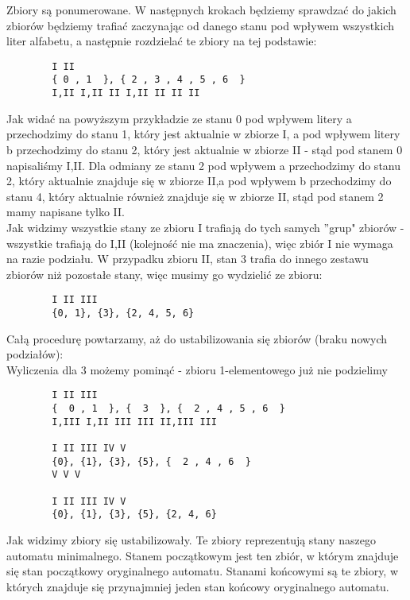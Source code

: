 \documentclass[main.tex]{subfiles}
\begin{document}
    \noindent Zbiory są ponumerowane. W następnych krokach będziemy sprawdzać do jakich zbiorów będziemy trafiać zaczynając od danego stanu pod wpływem wszystkich liter alfabetu,
    a następnie rozdzielać te zbiory na tej podstawie:
    \begin{verbatim}
        I II
        { 0 , 1  }, { 2 , 3 , 4 , 5 , 6  }
        I,II I,II II I,II II II II
    \end{verbatim}

    \noindent Jak widać na powyższym przykładzie ze stanu 0 pod wpływem litery a przechodzimy do stanu 1, który jest aktualnie w zbiorze I,
    a pod wpływem litery b przechodzimy do stanu 2, który jest aktualnie w zbiorze II - stąd pod stanem 0 napisaliśmy I,II.
    Dla odmiany ze stanu 2 pod wpływem a przechodzimy do stanu 2, który aktualnie znajduje się w zbiorze II,a pod wpływem b przechodzimy do stanu 4,
    który aktualnie również znajduje się w zbiorze II, stąd pod stanem 2 mamy napisane tylko II. \\

    \noindent Jak widzimy wszystkie stany ze zbioru I trafiają do tych samych ''grup" zbiorów - wszystkie trafiają do I,II (kolejność nie ma znaczenia),
    więc zbiór I nie wymaga na razie podziału. W przypadku zbioru II, stan 3 trafia do innego zestawu zbiorów niż pozostałe stany, więc musimy go wydzielić ze zbioru:
    \begin{verbatim}
        I II III
        {0, 1}, {3}, {2, 4, 5, 6}
    \end{verbatim}

    \noindent Całą procedurę powtarzamy, aż do ustabilizowania się zbiorów (braku nowych podziałów): \\
    \noindent Wyliczenia dla 3 możemy pominąć - zbioru 1-elementowego już nie podzielimy
    \begin{verbatim}
        I II III
        {  0 , 1  }, {  3  }, {  2 , 4 , 5 , 6  }
        I,III I,II III III II,III III

        I II III IV V
        {0}, {1}, {3}, {5}, {  2 , 4 , 6  }
        V V V

        I II III IV V
        {0}, {1}, {3}, {5}, {2, 4, 6}
    \end{verbatim}

    \noindent Jak widzimy zbiory się ustabilizowały. Te zbiory reprezentują stany naszego automatu minimalnego.
    Stanem początkowym jest ten zbiór, w którym znajduje się stan początkowy oryginalnego automatu.
    Stanami końcowymi są te zbiory, w których znajduje się przynajmniej jeden stan końcowy oryginalnego automatu. \\
\end{document}
